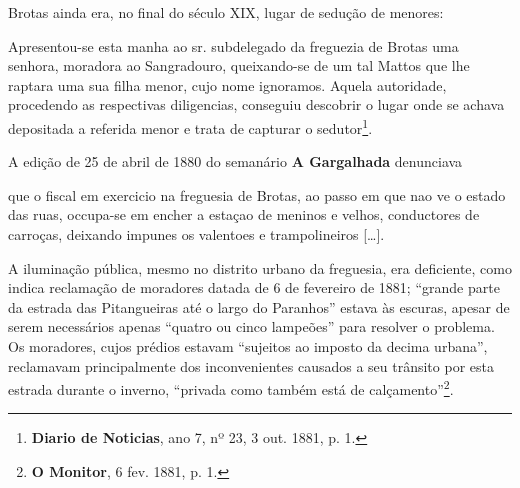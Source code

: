 Brotas ainda era, no final do século XIX, lugar de sedução de menores:

\begin{citacao}
Apresentou-se esta manha ao sr. subdelegado da freguezia de Brotas uma senhora, moradora ao Sangradouro, queixando-se de um tal Mattos que lhe raptara uma sua filha menor, cujo nome ignoramos. Aquela autoridade, procedendo as respectivas diligencias, conseguiu descobrir o lugar onde se achava depositada a referida menor e trata de capturar o sedutor\footnote{ \textbf{Diario de Noticias}, ano 7, nº 23, 3 out. 1881, p. 1.}.
\end{citacao}

A edição de 25 de abril de 1880 do semanário \textbf{A Gargalhada} denunciava

\begin{citacao}
que o fiscal em exercicio na freguesia de Brotas, ao passo em que nao ve o estado das ruas, occupa-se em encher a estaçao de meninos e velhos, conductores de carroças, deixando impunes os valentoes e trampolineiros [\dots].
\end{citacao}

A iluminação pública, mesmo no distrito urbano da freguesia, era deficiente, como indica reclamação de moradores datada de 6 de fevereiro de 1881; ``grande parte da estrada das Pitangueiras até o largo do Paranhos'' estava às escuras, apesar de serem necessários apenas ``quatro ou cinco lampeões'' para resolver o problema. Os moradores, cujos prédios estavam ``sujeitos ao imposto da decima urbana'', reclamavam principalmente dos inconvenientes causados a seu trânsito por esta estrada durante o inverno, ``privada como também está de calçamento''\footnote{\textbf{O Monitor}, 6 fev. 1881, p. 1.}.

